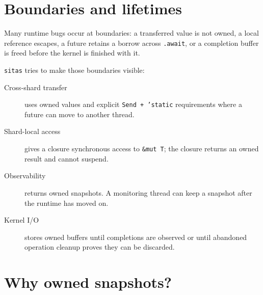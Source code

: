 \begin{center}
\end{center}

\section{Boundaries and lifetimes}

Many runtime bugs occur at boundaries: a transferred value is not owned, a
local reference escapes, a future retains a borrow across \texttt{.await}, or
a completion buffer is freed before the kernel is finished with it.

\texttt{sitas} tries to make those boundaries visible:

\begin{description}
    \item[Cross-shard transfer] uses owned values and explicit
        \texttt{Send + 'static} requirements where a future can move to another
        thread.
    \item[Shard-local access] gives a closure synchronous access to
        \texttt{\&mut T}; the closure returns an owned result and cannot
        suspend.
    \item[Observability] returns owned snapshots. A monitoring thread can keep
        a snapshot after the runtime has moved on.
    \item[Kernel I/O] stores owned buffers until completions are observed or
        until abandoned operation cleanup proves they can be discarded.
\end{description}

\section{Why owned snapshots?}

